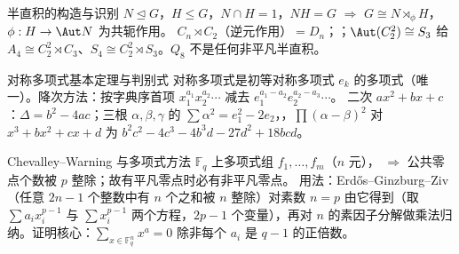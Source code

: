 \begin{结论}{半直积的构造与识别}
$N\trianglelefteq G$，$H\le G$，$N\cap H=1$，$NH=G$ $\Rightarrow$ $G\cong N\rtimes_\phi H$，$\phi:H\to\Aut N$ 为共轭作用。
$C_n\rtimes C_2$（逆元作用）$=D_n$；；$\Aut(C_2^2)\cong S_3$ 给 $A_4\cong C_2^2\rtimes C_3$、$S_4\cong C_2^2\rtimes S_3$。$Q_8$ 不是任何非平凡半直积。
\end{结论}

\begin{结论}{对称多项式基本定理与判别式}
对称多项式是初等对称多项式 $e_k$ 的多项式（唯一）。降次方法：按字典序首项 $x_1^{a_1}x_2^{a_2}\cdots$ 减去 $e_1^{a_1-a_2}e_2^{a_2-a_3}\cdots$。
二次 $ax^2+bx+c$：$\Delta=b^2-4ac$；三根 $\alpha,\beta,\gamma$ 的 $\sum\alpha^2=e_1^2-2e_2$，，$\prod(\alpha-\beta)^2$ 对 $x^3+bx^2+cx+d$ 为 $b^2c^2-4c^3-4b^3d-27d^2+18bcd$。
\end{结论}

\begin{结论}{Chevalley--Warning 与多项式方法}
$\mathbb F_q$ 上多项式组 $f_1,\dots,f_m$（$n$ 元）， $\Rightarrow$ 公共零点个数被 $p$ 整除；故有平凡零点时必有非平凡零点。
用法：Erdős--Ginzburg--Ziv（任意 $2n-1$ 个整数中有 $n$ 个之和被 $n$ 整除）对素数 $n=p$ 由它得到（取 $\sum a_ix_i^{p-1}$ 与 $\sum x_i^{p-1}$ 两个方程，$2p-1$ 个变量），再对 $n$ 的素因子分解做乘法归纳。证明核心：$\sum_{x\in\mathbb F_q^n}x^a=0$ 除非每个 $a_i$ 是 $q-1$ 的正倍数。
\end{结论}


